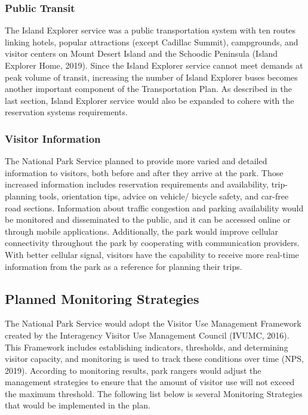 \subsubsection*{Public Transit}
\par The Island Explorer service was a public transportation system with ten routes linking hotels, popular attractions (except Cadillac Summit), campgrounds, and visitor centers on Mount Desert Island and the Schoodic Peninsula (Island Explorer Home, 2019). Since the Island Explorer service cannot meet demands at peak volume of transit, increasing the number of Island Explorer buses becomes another important component of the Transportation Plan. As described in the last section, Island Explorer service would also be expanded to cohere with the reservation systems requirements. 

\subsubsection*{Visitor Information}
\par The National Park Service planned to provide more varied and detailed information to visitors, both before and after they arrive at the park. Those increased information includes reservation requirements and availability, trip-planning tools, orientation tips, advice on vehicle/ bicycle safety, and car-free road sections. Information about traffic congestion and parking availability would be monitored and disseminated to the public, and it can be accessed online or through mobile applications. Additionally, the park would improve cellular connectivity throughout the park by cooperating with communication providers. With better cellular signal, visitors have the capability to receive more real-time information from the park as a reference for planning their trips.

\subsection{Planned Monitoring Strategies}
\par The National Park Service would adopt the Visitor Use Management Framework created by the Interagency Visitor Use Management Council (IVUMC, 2016). This Framework includes establishing indicators, thresholds, and determining visitor capacity, and monitoring is used to track these conditions over time (NPS, 2019). According to monitoring results, park rangers would adjust the management strategies to ensure that the amount of visitor use will not exceed the maximum threshold. The following list below is several Monitoring Strategies that would be implemented in the plan.

